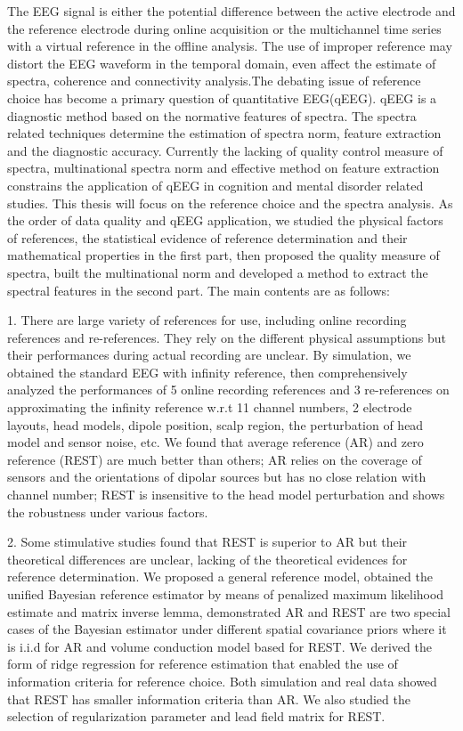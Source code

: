 
\begin{englishabstract}
The EEG signal is either the potential difference between the active electrode and the reference electrode during online acquisition or the multichannel time series with a virtual reference in the offline analysis. The use of improper reference may distort the EEG waveform in the temporal domain, even affect the estimate of spectra, coherence and connectivity analysis.The debating issue of reference choice has become a primary question of quantitative EEG(qEEG). qEEG is a diagnostic method based on the normative features of spectra. The spectra related techniques determine the estimation of spectra norm, feature extraction and the diagnostic accuracy. Currently the lacking of quality control measure of spectra, multinational spectra norm and effective method on feature extraction constrains the application of qEEG in cognition and mental disorder related studies. This thesis will focus on the reference choice and the spectra analysis. As the order of data quality and qEEG application, we studied the physical factors of references, the statistical evidence of reference determination and their mathematical properties in the first part, then proposed the quality measure of spectra, built the multinational norm and developed a method to extract the spectral features in the second part. The main contents are as follows:

1. There are large variety of references for use, including online recording references and re-references. They rely on the different physical assumptions but their performances during actual recording are unclear. By simulation, we obtained the standard EEG with infinity reference, then comprehensively analyzed the performances of 5 online recording references and 3 re-references on approximating the infinity reference w.r.t 11 channel numbers, 2 electrode layouts, head models, dipole position, scalp region, the perturbation of head model and sensor noise, etc. We found that average reference (AR) and zero reference (REST) are much better than others; AR relies on the coverage of sensors and the orientations of dipolar sources but has no close relation with channel number; REST is insensitive to the head model perturbation and shows the robustness under various factors. 

2. Some stimulative studies found that REST is superior to AR but their theoretical differences are unclear, lacking of the theoretical evidences for reference determination. We proposed a general reference model, obtained the unified Bayesian reference estimator by means of penalized maximum likelihood estimate and matrix inverse lemma, demonstrated AR and REST are two special cases of the Bayesian estimator under different spatial covariance priors where it is i.i.d for AR and volume conduction model based for REST. We derived the form of ridge regression for reference estimation that enabled the use of information criteria for reference choice. Both simulation and real data showed that REST has smaller information criteria than AR. We also studied the selection of regularization parameter and lead field matrix for REST. 


\end{englishabstract}
